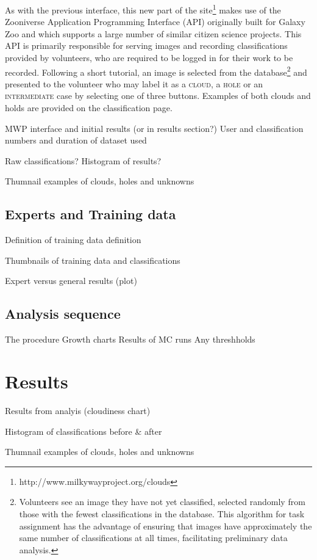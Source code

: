 \documentclass[a4,useAMS,usenatbib]{mn2e}
\begin{document}
As with the previous interface, this new part of the site\footnote{http://www.milkywayproject.org/clouds} makes use of the Zooniverse Application Programming Interface (API) originally built for Galaxy Zoo \citep{Lintottetal} and which supports a large number of similar citizen science projects. This API is primarily responsible for serving images and recording classifications provided by volunteers, who are required to be logged in for their work to be recorded. Following a short tutorial, an image is selected from the database\footnote{Volunteers see an image they have not yet classified, selected randomly from those with the fewest classifications in the database. This algorithm for task assignment has the advantage of ensuring that images have approximately the same number of classifications at all times, facilitating preliminary data analysis.} and presented to the volunteer who may label it as a \textsc{cloud}, a \textsc{hole} or an \textsc{intermediate} case by selecting one of three buttons. Examples of both clouds and holds are provided on the classification page. 

MWP interface and initial results (or in results section?)
User and classification numbers and duration of dataset used

Raw classifications?
Histogram of results?

Thumnail examples of clouds, holes and unknowns

\subsection{Experts and Training data}
Definition of training data definition

Thumbnails of training data and classifications

Expert versus general results (plot)

\subsection{Analysis sequence}
The procedure
Growth charts
Results of MC runs
Any threshholds


\section{Results}
Results from analyis (cloudiness chart)

Histogram of classifications before \& after

Thumnail examples of clouds, holes and unknowns
\end{document}
